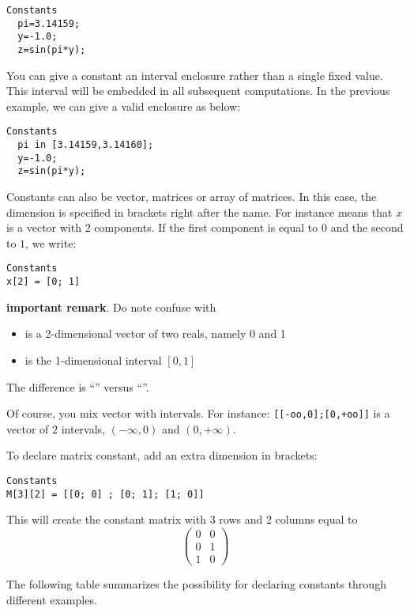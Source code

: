 \begin{verbatim}
Constants
  pi=3.14159;
  y=-1.0;
  z=sin(pi*y);
\end{verbatim} 

You can give a constant an interval enclosure rather than a single fixed value.
This interval will be embedded in all subsequent computations.
In the previous example, we can give  a valid enclosure as below:

\begin{verbatim}
Constants
  pi in [3.14159,3.14160];
  y=-1.0;
  z=sin(pi*y);
\end{verbatim}

Constants can also be vector, matrices or array of matrices.
In this case, the dimension is specified in brackets
right after the name. For instance  means that 
$x$ is a vector with 2 components. If the first component is equal
to $0$ and the second to $1$, we write: 
\begin{verbatim}
Constants
x[2] = [0; 1]
\end{verbatim}

{\bf important remark}. Do note confuse
\cf{[0;1]} with \cf{[0,1]}
\begin{itemize}
\item \cf{[0;1]} is a 2-dimensional vector of two reals, namely 0 and 1
\item \cf{[0,1]} is the 1-dimensional interval $[0,1]$
\end{itemize}
The difference is ``\cf{;}'' versus ``\cf{,}''.

Of course, you mix vector with intervals. For instance:
{\tt [[-oo,0];[0,+oo]]} is a vector of $2$ intervals, $(-\infty,0)$ and $(0,+\infty)$.

To declare matrix constant, add an extra dimension in brackets:
\begin{verbatim}
Constants
M[3][2] = [[0; 0] ; [0; 1]; [1; 0]]
\end{verbatim}
This will create the constant matrix  with 3 rows and 2 columns equal to
$$\begin{pmatrix}
0 & 0 \\ 0 & 1 \\ 1 & 0
\end{pmatrix}$$


The following table summarizes the possibility for declaring constants
through different examples.

